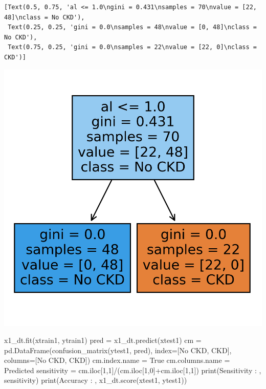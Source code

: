 \documentclass[
  11pt,
  letterpaper,
  DIV=11,
  numbers=noendperiod]{scrartcl}
\newenvironment{Shaded}{\begin{snugshade}}{\end{snugshade}}
\newcommand{\BuiltInTok}[1]{\textcolor[rgb]{0.00,0.23,0.31}{#1}}
\newcommand{\DecValTok}[1]{\textcolor[rgb]{0.68,0.00,0.00}{#1}}
\newcommand{\NormalTok}[1]{\textcolor[rgb]{0.00,0.23,0.31}{#1}}
\newcommand{\OperatorTok}[1]{\textcolor[rgb]{0.37,0.37,0.37}{#1}}
\newcommand{\StringTok}[1]{\textcolor[rgb]{0.13,0.47,0.30}{#1}}
\begin{document}
\begin{verbatim}
[Text(0.5, 0.75, 'al <= 1.0\ngini = 0.431\nsamples = 70\nvalue = [22, 48]\nclass = No CKD'),
 Text(0.25, 0.25, 'gini = 0.0\nsamples = 48\nvalue = [0, 48]\nclass = No CKD'),
 Text(0.75, 0.25, 'gini = 0.0\nsamples = 22\nvalue = [22, 0]\nclass = CKD')]
\end{verbatim}

\includegraphics{Seebach_Lily_HW6_files/figure-pdf/cell-26-output-2.png}

\begin{Shaded}
\begin{Highlighting}[]
\NormalTok{x1\_dt.fit(xtrain1, ytrain1)}
\NormalTok{pred }\OperatorTok{=}\NormalTok{ x1\_dt.predict(xtest1)}
\NormalTok{cm }\OperatorTok{=}\NormalTok{ pd.DataFrame(confusion\_matrix(ytest1, pred), index}\OperatorTok{=}\NormalTok{[}\StringTok{\textquotesingle{}No CKD\textquotesingle{}}\NormalTok{, }\StringTok{\textquotesingle{}CKD\textquotesingle{}}\NormalTok{], columns}\OperatorTok{=}\NormalTok{[}\StringTok{\textquotesingle{}No CKD\textquotesingle{}}\NormalTok{, }\StringTok{\textquotesingle{}CKD\textquotesingle{}}\NormalTok{])}
\NormalTok{cm.index.name }\OperatorTok{=} \StringTok{\textquotesingle{}True\textquotesingle{}}
\NormalTok{cm.columns.name }\OperatorTok{=} \StringTok{\textquotesingle{}Predicted\textquotesingle{}}
\NormalTok{sensitivity }\OperatorTok{=}\NormalTok{ cm.iloc[}\DecValTok{1}\NormalTok{,}\DecValTok{1}\NormalTok{]}\OperatorTok{/}\NormalTok{(cm.iloc[}\DecValTok{1}\NormalTok{,}\DecValTok{0}\NormalTok{]}\OperatorTok{+}\NormalTok{cm.iloc[}\DecValTok{1}\NormalTok{,}\DecValTok{1}\NormalTok{])}
\BuiltInTok{print}\NormalTok{(}\StringTok{\textquotesingle{}Sensitivity : \textquotesingle{}}\NormalTok{, sensitivity)}
\BuiltInTok{print}\NormalTok{(}\StringTok{\textquotesingle{}Accuracy : \textquotesingle{}}\NormalTok{, x1\_dt.score(xtest1, ytest1))}
\end{Highlighting}
\end{Shaded}
\end{document}
